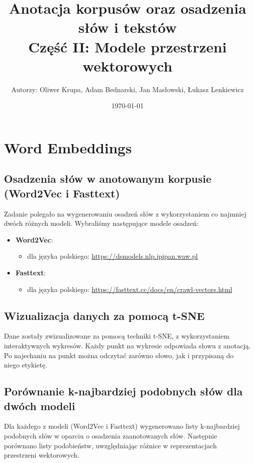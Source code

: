 \documentclass[12pt]{article}
\title{Anotacja korpusów oraz osadzenia słów i tekstów\\Część II: Modele przestrzeni wektorowych}
\author{Autorzy: Oliwer Krupa, Adam Bednarski, Jan Masłowski, Łukasz Lenkiewicz}
\date{\today}
\begin{document}
\maketitle
\newpage

\tableofcontents
\newpage

\section{Word Embeddings}

\subsection{Osadzenia słów w anotowanym korpusie (Word2Vec i Fasttext)}
Zadanie polegało na wygenerowaniu osadzeń słów z wykorzystaniem co najmniej dwóch różnych modeli. Wybraliśmy następujące modele osadzeń:
\begin{itemize}
    \item \textbf{Word2Vec}:
    \begin{itemize}
        \item dla języka polskiego: \url{https://dsmodels.nlp.ipipan.waw.pl}
    \end{itemize}
    \item \textbf{Fasttext}:
    \begin{itemize}
        \item dla języka polskiego: \url{https://fasttext.cc/docs/en/crawl-vectors.html}
    \end{itemize}
\end{itemize}

\subsection{Wizualizacja danych za pomocą t-SNE}
Dane zostały zwizualizowane za pomocą techniki t-SNE, z wykorzystaniem interaktywnych wykresów. Każdy punkt na wykresie odpowiada słowu z anotacją. Po najechaniu na punkt można odczytać zarówno słowo, jak i przypisaną do niego etykietę.

\subsection{Porównanie k-najbardziej podobnych słów dla dwóch modeli}
Dla każdego z modeli (Word2Vec i Fasttext) wygenerowano listy k-najbardziej podobnych słów w oparciu o osadzenia zaanotowanych słów. Następnie porównano listy podobieństw, uwzględniając różnice w reprezentacjach przestrzeni wektorowych.
\end{document}
